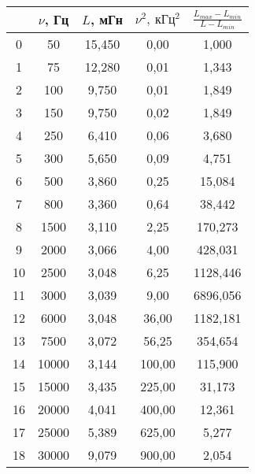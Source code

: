 \begin{table}
\centering
\begin{tabular}{|c|c|c|c|c|}
\hline
 & $\nu$, Гц & $L$, мГн & $\nu^2,\ кГц^2$ & $\frac{L_{max} - L_{min}}{L - L_{min}}$ \\
\hline
0 & 50 & 15,450 & 0,00 & 1,000 \\
\cline{1-5}
1 & 75 & 12,280 & 0,01 & 1,343 \\
\cline{1-5}
2 & 100 & 9,750 & 0,01 & 1,849 \\
\cline{1-5}
3 & 150 & 9,750 & 0,02 & 1,849 \\
\cline{1-5}
4 & 250 & 6,410 & 0,06 & 3,680 \\
\cline{1-5}
5 & 300 & 5,650 & 0,09 & 4,751 \\
\cline{1-5}
6 & 500 & 3,860 & 0,25 & 15,084 \\
\cline{1-5}
7 & 800 & 3,360 & 0,64 & 38,442 \\
\cline{1-5}
8 & 1500 & 3,110 & 2,25 & 170,273 \\
\cline{1-5}
9 & 2000 & 3,066 & 4,00 & 428,031 \\
\cline{1-5}
10 & 2500 & 3,048 & 6,25 & 1128,446 \\
\cline{1-5}
11 & 3000 & 3,039 & 9,00 & 6896,056 \\
\cline{1-5}
12 & 6000 & 3,048 & 36,00 & 1182,181 \\
\cline{1-5}
13 & 7500 & 3,072 & 56,25 & 354,654 \\
\cline{1-5}
14 & 10000 & 3,144 & 100,00 & 115,900 \\
\cline{1-5}
15 & 15000 & 3,435 & 225,00 & 31,173 \\
\cline{1-5}
16 & 20000 & 4,041 & 400,00 & 12,361 \\
\cline{1-5}
17 & 25000 & 5,389 & 625,00 & 5,277 \\
\cline{1-5}
18 & 30000 & 9,079 & 900,00 & 2,054 \\
\cline{1-5}
\hline
\end{tabular}
\end{table}

